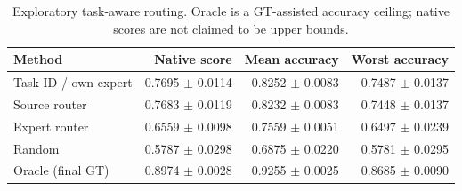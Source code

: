 \begin{table}[H]\centering\small
\caption{Exploratory task-aware routing. Oracle is a GT-assisted accuracy ceiling; native scores are not claimed to be upper bounds.}
\begin{tabular}{lrrr}\toprule
Method & Native score & Mean accuracy & Worst accuracy\\\midrule
Task ID / own expert & 0.7695 $\pm$ 0.0114 & 0.8252 $\pm$ 0.0083 & 0.7487 $\pm$ 0.0137\\
Source router & 0.7683 $\pm$ 0.0119 & 0.8232 $\pm$ 0.0083 & 0.7448 $\pm$ 0.0137\\
Expert router & 0.6559 $\pm$ 0.0098 & 0.7559 $\pm$ 0.0051 & 0.6497 $\pm$ 0.0239\\
Random & 0.5787 $\pm$ 0.0298 & 0.6875 $\pm$ 0.0220 & 0.5781 $\pm$ 0.0295\\
Oracle (final GT) & 0.8974 $\pm$ 0.0028 & 0.9255 $\pm$ 0.0025 & 0.8685 $\pm$ 0.0090\\
\bottomrule\end{tabular}\end{table}
